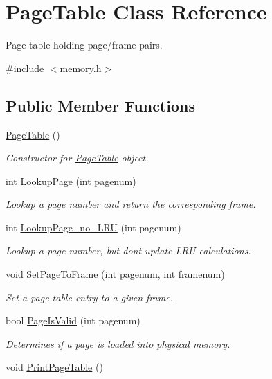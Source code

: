 \hypertarget{classPageTable}{}\section{Page\+Table Class Reference}
\label{classPageTable}


Page table holding page/frame pairs.  




{\ttfamily \#include $<$memory.\+h$>$}

\subsection*{Public Member Functions}
\begin{DoxyCompactItemize}
\item 
\hyperlink{classPageTable_a75c92e794fd3f5397d2499d54dac22c9}{Page\+Table} ()\hypertarget{classPageTable_a75c92e794fd3f5397d2499d54dac22c9}{}\label{classPageTable_a75c92e794fd3f5397d2499d54dac22c9}

\begin{DoxyCompactList}\small\item\em Constructor for \hyperlink{classPageTable}{Page\+Table} object. \end{DoxyCompactList}\item 
int \hyperlink{classPageTable_a2590af90445c76b97420da95cf7210ec}{Lookup\+Page} (int pagenum)
\begin{DoxyCompactList}\small\item\em Lookup a page number and return the corresponding frame. \end{DoxyCompactList}\item 
int \hyperlink{classPageTable_a3444b04644cb833bfd2a9b615704e6a1}{Lookup\+Page\+\_\+no\+\_\+\+L\+RU} (int pagenum)
\begin{DoxyCompactList}\small\item\em Lookup a page number, but don\textquotesingle{}t update L\+RU calculations. \end{DoxyCompactList}\item 
void \hyperlink{classPageTable_ac961a37f5dde09c3addce2fcd118f24d}{Set\+Page\+To\+Frame} (int pagenum, int framenum)\hypertarget{classPageTable_ac961a37f5dde09c3addce2fcd118f24d}{}\label{classPageTable_ac961a37f5dde09c3addce2fcd118f24d}

\begin{DoxyCompactList}\small\item\em Set a page table entry to a given frame. \end{DoxyCompactList}\item 
bool \hyperlink{classPageTable_ac43e4430873d7760eb7a25cd9a025f8c}{Page\+Is\+Valid} (int pagenum)
\begin{DoxyCompactList}\small\item\em Determines if a page is loaded into physical memory. \end{DoxyCompactList}\item 
void \hyperlink{classPageTable_ab06580f0815ea97a303a09da860a670b}{Print\+Page\+Table} ()\hypertarget{classPageTable_ab06580f0815ea97a303a09da860a670b}{}\label{classPageTable_ab06580f0815ea97a303a09da860a670b}


\end{DoxyCompactItemize}
